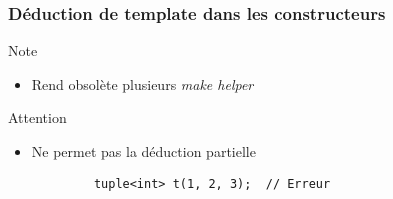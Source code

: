 \documentclass[C++.tex]{subfiles}
\begin{document}
\begin{frame}[fragile]
\frametitle{Déduction de template dans les constructeurs}
	\begin{block}{Note}
		\begin{itemize}
			\item Rend obsolète plusieurs \textit{make helper}
		\end{itemize}
	\end{block}

	\begin{alertblock}{Attention}
		\begin{itemize}
			\item Ne permet pas la déduction partielle
		\end{itemize}

		\begin{verbatim}
			tuple<int> t(1, 2, 3);  // Erreur
		\end{verbatim}
	\end{alertblock}

\end{frame}
\end{document}
